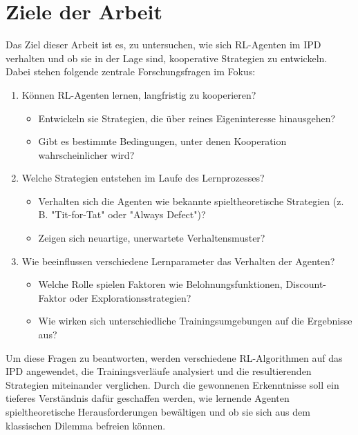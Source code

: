 \section{Ziele der Arbeit}
Das Ziel dieser Arbeit ist es, zu untersuchen, wie sich RL-Agenten im IPD verhalten
und ob sie in der Lage sind, kooperative Strategien zu entwickeln. Dabei stehen 
folgende zentrale Forschungsfragen im Fokus:
\begin{enumerate}
    \item Können RL-Agenten lernen, langfristig zu kooperieren?
        \begin{itemize}
            \item Entwickeln sie Strategien, die über reines Eigeninteresse hinausgehen?
            \item Gibt es bestimmte Bedingungen, unter denen Kooperation wahrscheinlicher wird?
        \end{itemize}
    \item Welche Strategien entstehen im Laufe des Lernprozesses?
        \begin{itemize}
            \item Verhalten sich die Agenten wie bekannte spieltheoretische Strategien (z. B. "Tit-for-Tat" oder "Always Defect")?
            \item Zeigen sich neuartige, unerwartete Verhaltensmuster?
        \end{itemize}
    \item Wie beeinflussen verschiedene Lernparameter das Verhalten der Agenten?
        \begin{itemize}
            \item Welche Rolle spielen Faktoren wie Belohnungsfunktionen, Discount-Faktor oder Explorationsstrategien?
            \item Wie wirken sich unterschiedliche Trainingsumgebungen auf die Ergebnisse aus?
        \end{itemize}
\end{enumerate}
Um diese Fragen zu beantworten, werden verschiedene RL-Algorithmen auf das IPD 
angewendet, die Trainingsverläufe analysiert und die resultierenden Strategien 
miteinander verglichen. Durch die gewonnenen Erkenntnisse soll ein tieferes Verständnis 
dafür geschaffen werden, wie lernende Agenten spieltheoretische Herausforderungen 
bewältigen und ob sie sich aus dem klassischen Dilemma befreien können.